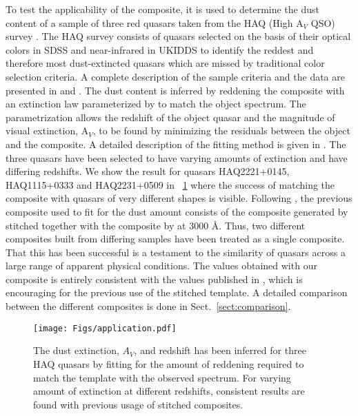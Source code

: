\documentclass{aa}    %
\newcommand{\figref}[1]{\ref{fig:#1}}
\newcommand{\Fig}[1]{\figurename~\figref{#1}}
\newcommand{\fig}[1]{\Fig{#1}}
\newcommand{\figlabel}[1]{\label{fig:#1}}
\newcommand{\sectionname}{Sect.}
\newcommand{\Sect}[1]{\sectionname~\ref{sect:#1}}
\newcommand{\sect}[1]{\Sect{#1}}
\begin{document}
To test the applicability of the composite, it is used to determine the dust content of a sample of three red quasars taken from the HAQ (High A$_V$ QSO) survey \citep{Krogager2015}. The HAQ survey consists of quasars selected on the basis of their optical colors in SDSS and near-infrared in UKIDDS to identify the reddest and therefore most dust-extincted quasars which are missed by traditional color selection criteria. A complete description of the sample criteria and the data are presented in \citet{Fynbo2013} and \citet{Krogager2015}. The dust content is inferred by reddening the composite with an extinction law parameterized by \citet{Gordon2003} to match the object spectrum. The parametrization allows the redshift of the object quasar and the magnitude of visual extinction, A$_V$, to be found by minimizing the residuals between the object and the composite. A detailed description of the fitting method is given in \cite{Krogager2015}.
The three quasars have been selected to have varying amounts of extinction and have differing redshifts. We show the result for quasars HAQ2221+0145, HAQ1115+0333 and HAQ2231+0509 in \fig{application} where the success of matching the composite with quasars of very different shapes is visible. 
Following \cite{Wang2012}, the previous composite used to fit for the dust amount consists of the composite generated by \cite{VandenBerk2001} stitched together with the composite by \cite{Glikman2006} at 3000 \AA. Thus, two different composites built from differing samples have been treated as a single composite. That this has been successful is a testament to the similarity of quasars across a large range of apparent physical conditions. 
The values obtained with our composite is entirely consistent with the values published in \cite{Krogager2015}, which is encouraging for the previous use of the stitched template. A detailed comparison between the different composites is done in \sect{comparison}.

\begin{figure}[t!]
 \centering
 \texttt{[image: Figs/application.pdf]}
 \caption[]{The dust extinction, $A_V$, and redshift has been inferred for three HAQ quasars by fitting for the amount of reddening required to match the template with the observed spectrum. For varying amount of extinction at different redshifts, consistent results are found with previous usage of stitched composites.}
 \figlabel{application}
\end{figure}
 
\end{document}

